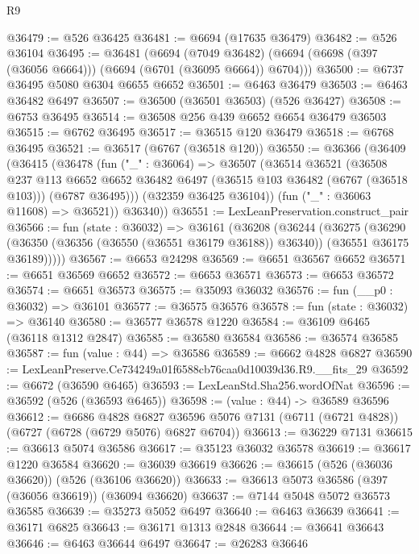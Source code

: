 \begin{lexlean}{R9}
\begin{coremodule}
@36479 := @526 @36425
@36481 := @6694 (@17635 @36479)
@36482 := @526 @36104
@36495 := @36481
    (@6694
      (@7049 @36482)
      (@6694 (@6698 (@397 (@36056 @6664))) (@6694 (@6701 (@36095 @6664)) @6704)))
@36500 := @6737 @36495 @5080 @6304 @6655 @6652
@36501 := @6463 @36479
@36503 := @6463 @36482 @6497
@36507 := @36500 (@36501 @36503) (@526 @36427)
@36508 := @6753 @36495
@36514 := @36508 @256 @439 @6652 @6654 @36479 @36503
@36515 := @6762 @36495
@36517 := @36515 @120 @36479
@36518 := @6768 @36495
@36521 := @36517 (@6767 (@36518 @120))
@36550 := @36366
    (@36409
      (@36415
        (@36478
          (fun ("_" : @36064) =>
          @36507
            (@36514
              @36521
              (@36508
                @237
                @113
                @6652
                @6652
                @36482
                @6497
                (@36515 @103 @36482 (@6767 (@36518 @103)))
                (@6787 @36495)))
            (@32359 @36425 @36104))
          (fun ("_" : @36063 @11608) => @36521))
        @36340))
@36551 := LexLeanPreservation.construct_pair
@36566 := fun (state : @36032) =>
  @36161
    (@36208
      (@36244
        (@36275
          (@36290
            (@36350 (@36356 (@36550 (@36551 @36179 @36188)) @36340))
            (@36551 @36175 @36189)))))
@36567 := @6653 @24298
@36569 := @6651 @36567 @6652
@36571 := @6651 @36569 @6652
@36572 := @6653 @36571
@36573 := @6653 @36572
@36574 := @6651 @36573
@36575 := @35093 @36032
@36576 := fun (__p0 : @36032) => @36101
@36577 := @36575 @36576
@36578 := fun (state : @36032) => @36140
@36580 := @36577 @36578 @1220
@36584 := @36109 @6465 (@36118 @1312 @2847)
@36585 := @36580 @36584
@36586 := @36574 @36585
@36587 := fun (value : @44) => @36586
@36589 := @6662 @4828 @6827
@36590 := LexLeanPreserve.Ce734249a01f6588cb76caa0d10039d36.R9.__fits_29
@36592 := @6672 (@36590 @6465)
@36593 := LexLeanStd.Sha256.wordOfNat
@36596 := @36592 (@526 (@36593 @6465))
@36598 := (value : @44) -> @36589 @36596
@36612 := @6686
    @4828
    @6827
    @36596
    @5076
    @7131
    (@6711 (@6721 @4828))
    (@6727 (@6728 (@6729 @5076) @6827 @6704))
@36613 := @36229 @7131
@36615 := @36613 @5074 @36586
@36617 := @35123 @36032 @36578
@36619 := @36617 @1220 @36584
@36620 := @36039 @36619
@36626 := @36615 (@526 (@36036 @36620)) (@526 (@36106 @36620))
@36633 := @36613 @5073 @36586 (@397 (@36056 @36619)) (@36094 @36620)
@36637 := @7144 @5048 @5072 @36573 @36585
@36639 := @35273 @5052 @6497
@36640 := @6463 @36639
@36641 := @36171 @6825
@36643 := @36171 @1313 @2848
@36644 := @36641 @36643
@36646 := @6463 @36644 @6497
@36647 := @26283 @36646

\end{coremodule}
\end{lexlean}
